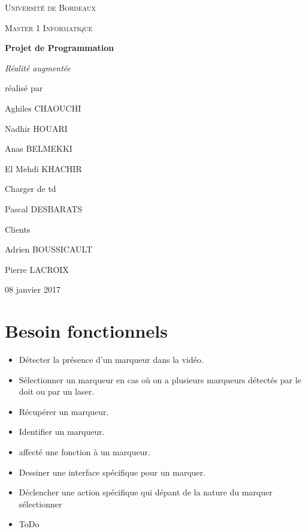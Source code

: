 \documentclass[12pt,a4paper]{article}
\begin{document}
\begin{titlepage}
\centering
{\scshape\LARGE Université de Bordeaux \par}
{\scshape\Large Master 1 Informatique \par}
\vspace{3cm}

{\Huge\bfseries Projet de Programmation \par}%
\vspace{0.5cm}
{\Large\itshape Réalité augmentée \par}

\vfill
réalisé par \par
Aghiles \textsc{CHAOUCHI} \par
Nadhir \textsc{HOUARI} \par
Anas \textsc{BELMEKKI} \par
El Mehdi \textsc{KHACHIR} \par \par
Charger de td \par
Pascal \textsc{DESBARATS} \par \par
Clients \par
Adrien \textsc{BOUSSICAULT} \par
Pierre \textsc{LACROIX} \par
\vfill

{\large 08 janvier 2017\par}

\end{titlepage}
\section{Besoin fonctionnels}
\begin{itemize}
 \item Détecter la présence d'un marqueur dans la vidéo.
 \item Sélectionner un marqueur en cas où on a plusieurs marqueurs détectés par le doit ou par un laser.
 \item Récupérer un marqueur.
 \item Identifier un marqueur.
 \item affecté une fonction à un marqueur.
 \item Dessiner une interface spécifique pour un marquer.
 \item Déclencher une action spécifique qui dépant de la nature du marquer sélectionner
\end{itemize}
\begin{itemize}
  \item ToDo
\end{itemize}
\end{document}
